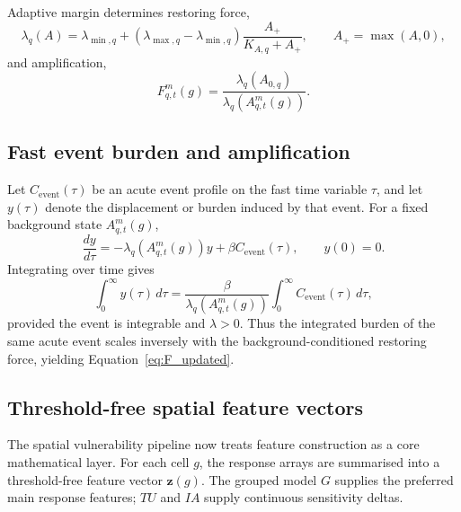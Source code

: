 Adaptive margin determines restoring force,
\begin{equation}
  \lambda_q(A)=\lambda_{\min,q}+\left(\lambda_{\max,q}-\lambda_{\min,q}\right)\frac{A_+}{K_{A,q}+A_+},
  \qquad A_+=\max(A,0),
  \label{eq:lambda_updated}
\end{equation}
and amplification,
\begin{equation}
  F_{q,t}^{m}(g)=\frac{\lambda_q(A_{0,q})}{\lambda_q(A_{q,t}^{m}(g))}.
  \label{eq:F_updated}
\end{equation}

\subsection{Fast event burden and amplification}

Let $C_{\mathrm{event}}(\tau)$ be an acute event profile on the fast time variable $\tau$, and let $y(\tau)$ denote the displacement or burden induced by that event. For a fixed background state $A_{q,t}^{m}(g)$,
\begin{equation}
  \frac{dy}{d\tau}=-\lambda_q(A_{q,t}^{m}(g))y+\beta C_{\mathrm{event}}(\tau),
  \qquad y(0)=0.
\end{equation}
Integrating over time gives
\begin{equation}
  \int_0^\infty y(\tau)\,d\tau
  =\frac{\beta}{\lambda_q(A_{q,t}^{m}(g))}\int_0^\infty C_{\mathrm{event}}(\tau)\,d\tau,
\end{equation}
provided the event is integrable and $\lambda>0$. Thus the integrated burden of the same acute event scales inversely with the background-conditioned restoring force, yielding Equation~\eqref{eq:F_updated}.

\subsection{Threshold-free spatial feature vectors}

The spatial vulnerability pipeline now treats feature construction as a core mathematical layer. For each cell $g$, the response arrays are summarised into a threshold-free feature vector $\bm z(g)$. The grouped model $G$ supplies the preferred main response features; $TU$ and $IA$ supply continuous sensitivity deltas.

